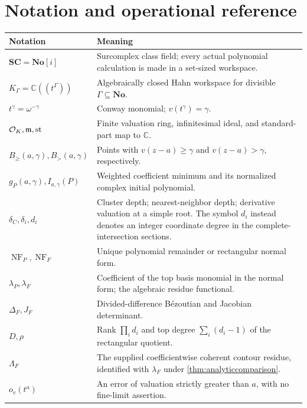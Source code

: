 \documentclass[11pt,letterpaper,oneside]{article}
\numberwithin{equation}{section}
\theoremstyle{definition}
\theoremstyle{remark}\newtheorem{remark}[theorem]{Remark}
\newcommand{\No}{\mathbf{No}}\newcommand{\SC}{\mathbf{SC}}
\newcommand{\C}{\mathbb C}\newcommand{\R}{\mathbb R}\newcommand{\Q}{\mathbb Q}
\newcommand{\OO}{\mathcal O}\newcommand{\mm}{\mathfrak m}
\newcommand{\NF}{\operatorname{NF}}\newcommand{\Tr}{\operatorname{Tr}}
\newcommand{\Bcl}{B_{\geq}}\newcommand{\Bop}{B_{>}}
\begin{document}
\section{Notation and operational reference}\label{app:notation}
\begin{longtable}{@{}L{0.30\textwidth}L{0.60\textwidth}@{}}
\toprule
Notation & Meaning\\
\midrule
\endhead
$\SC=\No[i]$ & Surcomplex class field; every actual polynomial calculation
is made in a set-sized workspace.\\[0.35em]
$K_\Gamma=\C((t^\Gamma))$ & Algebraically closed Hahn workspace for
divisible $\Gamma\subseteq\No$.\\[0.35em]
$t^\gamma=\omega^{-\gamma}$ & Conway monomial; $v(t^\gamma)=\gamma$.\\[0.35em]
$\OO_K,\mm,\st$ & Finite valuation ring, infinitesimal ideal, and
standard-part map to $\C$.\\[0.35em]
$\Bcl(a,\gamma),\Bop(a,\gamma)$ & Points with $v(z-a)\geq\gamma$ and
$v(z-a)>\gamma$, respectively.\\[0.35em]
$g_P(a,\gamma),I_{a,\gamma}(P)$ & Weighted coefficient minimum and its
normalized complex initial polynomial.\\[0.35em]
$\delta_C,\delta_i,d_i$ & Cluster depth; nearest-neighbor depth; derivative
valuation at a simple root. The symbol $d_i$ instead denotes an integer
coordinate degree in the complete-intersection sections.\\[0.35em]
$\NF_P,\NF_F$ & Unique polynomial remainder or rectangular normal form.\\[0.35em]
$\lambda_P,\lambda_F$ & Coefficient of the top basis monomial in the
normal form; the algebraic residue functional.\\[0.35em]
$\Delta_F,J_F$ & Divided-difference B\'ezoutian and Jacobian determinant.\\[0.35em]
$D,\rho$ & Rank $\prod_i d_i$ and top degree $\sum_i(d_i-1)$ of the
rectangular quotient.\\[0.35em]
$\Lambda_F$ & The supplied coefficientwise coherent contour residue,
identified with $\lambda_F$ under \cref{thm:analyticcomparison}.\\[0.35em]
$o_v(t^a)$ & An error of valuation strictly greater than $a$, with no
fine-limit assertion.\\
\bottomrule
\end{longtable}
\end{document}
